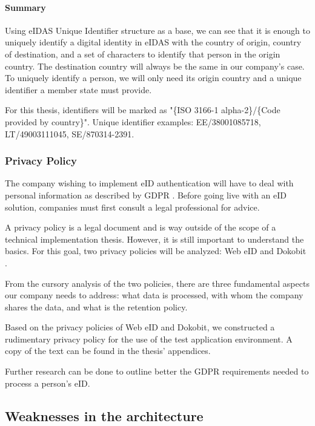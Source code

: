 \paragraph{Summary} Using eIDAS Unique Identifier structure as a base, we can see that it is enough to uniquely identify a digital identity in eIDAS with the country of origin, country of destination, and a set of characters to identify that person in the origin country. The destination country will always be the same in our company's case. To uniquely identify a person, we will only need its origin country and a unique identifier a member state must provide.

For this thesis, identifiers will be marked as "{\{ISO 3166-1 alpha-2\}}/{\{Code provided by country\}}". Unique identifier examples: EE/38001085718, LT/49003111045, SE/870314-2391.

\subsubsection{Privacy Policy}

The company wishing to implement eID authentication will have to deal with personal information as described by GDPR \cite{eulaw-gdpr}. Before going live with an eID solution, companies must first consult a legal professional for advice.

A privacy policy is a legal document and is way outside of the scope of a technical implementation thesis. However, it is still important to understand the basics. For this goal, two privacy policies will be analyzed: Web eID \cite{legal-webeid-privacypolicy} and Dokobit \cite{legal-dokobit-privacypolicy}.

From the cursory analysis of the two policies, there are three fundamental aspects our company needs to address: what data is processed, with whom the company shares the data, and what is the retention policy.

Based on the privacy policies of Web eID and Dokobit, we constructed a rudimentary privacy policy for the use of the test application environment. A copy of the text can be found in the thesis' appendices.

Further research can be done to outline better the GDPR requirements needed to process a person's eID.

\subsection{Weaknesses in the architecture}

